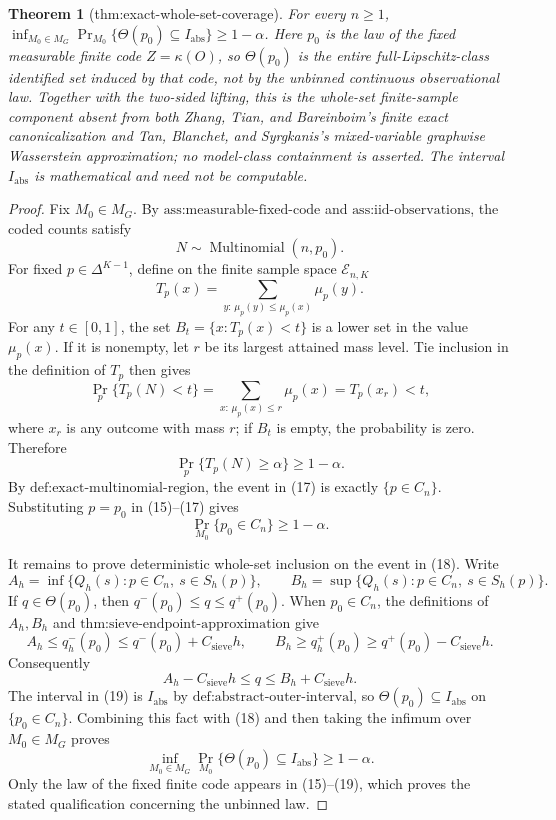 \documentclass{article}
\newtheorem{theorem}{Theorem}
\begin{document}
\begin{theorem}[thm:exact-whole-set-coverage]\label{thm:exact-whole-set-coverage}
For every \(n\ge1\), \(\inf_{M_0\in M_G}\Pr_{M_0}\{\Theta(p_0)\subseteq I_{\mathrm{abs}}\}\ge1-\alpha\). Here \(p_0\) is the law of the fixed measurable finite code \(Z=\kappa(O)\), so \(\Theta(p_0)\) is the entire full-Lipschitz-class identified set induced by that code, not by the unbinned continuous observational law. Together with the two-sided lifting, this is the whole-set finite-sample component absent from both Zhang, Tian, and Bareinboim's finite exact canonicalization and Tan, Blanchet, and Syrgkanis's mixed-variable graphwise Wasserstein approximation; no model-class containment is asserted. The interval \(I_{\mathrm{abs}}\) is mathematical and need not be computable.
\end{theorem}
\begin{proof}
Fix \(M_0\in M_G\).  By \(\text{ass:measurable-fixed-code}\) and \(\text{ass:iid-observations}\), the coded counts satisfy
\[
N\sim\operatorname{Multinomial}(n,p_0).                           \tag{15}
\]
For fixed \(p\in\Delta^{K-1}\), define on the finite sample space \(\mathcal E_{n,K}\)
\[
T_p(x)=\sum_{y:\,\mu_p(y)\leq\mu_p(x)}\mu_p(y).
\]
For any \(t\in[0,1]\), the set \(B_t=\{x:T_p(x)<t\}\) is a lower set in the value \(\mu_p(x)\).  If it is nonempty, let \(r\) be its largest attained mass level.  Tie inclusion in the definition of \(T_p\) then gives
\[
\Pr_p\{T_p(N)<t\}=\sum_{x:\,\mu_p(x)\leq r}\mu_p(x)=T_p(x_r)<t, \tag{16}
\]
where \(x_r\) is any outcome with mass \(r\); if \(B_t\) is empty, the probability is zero.  Therefore
\[
\Pr_p\{T_p(N)\geq\alpha\}\geq1-\alpha.                         \tag{17}
\]
By \(\text{def:exact-multinomial-region}\), the event in (17) is exactly \(\{p\in C_n\}\).  Substituting \(p=p_0\) in (15)--(17) gives
\[
\Pr_{M_0}\{p_0\in C_n\}\geq1-\alpha.                         \tag{18}
\]

It remains to prove deterministic whole-set inclusion on the event in (18).  Write
\[
A_h=\inf\{Q_h(s):p\in C_n,\ s\in S_h(p)\},\qquad
B_h=\sup\{Q_h(s):p\in C_n,\ s\in S_h(p)\}.
\]
If \(q\in\Theta(p_0)\), then \(q^-(p_0)\leq q\leq q^+(p_0)\).  When \(p_0\in C_n\), the definitions of \(A_h,B_h\) and \(\text{thm:sieve-endpoint-approximation}\) give
\[
A_h\leq q_h^-(p_0)\leq q^-(p_0)+C_{\mathrm{sieve}}h,
\qquad
B_h\geq q_h^+(p_0)\geq q^+(p_0)-C_{\mathrm{sieve}}h.
\]
Consequently
\[
A_h-C_{\mathrm{sieve}}h\leq q\leq B_h+C_{\mathrm{sieve}}h.      \tag{19}
\]
The interval in (19) is \(I_{\mathrm{abs}}\) by \(\text{def:abstract-outer-interval}\), so \(\Theta(p_0)\subseteq I_{\mathrm{abs}}\) on \(\{p_0\in C_n\}\).  Combining this fact with (18) and then taking the infimum over \(M_0\in M_G\) proves
\[
\inf_{M_0\in M_G}\Pr_{M_0}\{\Theta(p_0)\subseteq I_{\mathrm{abs}}\}\geq1-\alpha.
\]
Only the law of the fixed finite code appears in (15)--(19), which proves the stated qualification concerning the unbinned law.
\end{proof}
\end{document}

